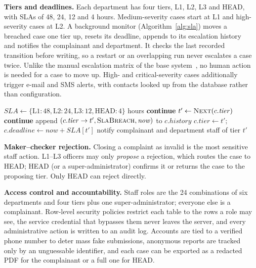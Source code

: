 \documentclass[conference]{IEEEtran}
\begin{document}
\textbf{Tiers and deadlines.} Each department has four tiers, L1, L2, L3 and HEAD, with SLAs of 48, 24, 12 and
4 hours. Medium-severity cases start at L1 and high-severity cases at L2. A background
monitor (Algorithm~\ref{alg:sla}) moves a breached case one tier up, resets its deadline, appends to its
escalation history and notifies the complainant and department. It checks the last recorded transition before
writing, so a restart or an overlapping run never escalates a case twice. Unlike the manual escalation matrix of
the base system~\cite{mohanraj2025railmadad}, no human action is needed for a case to move up. High- and
critical-severity cases additionally trigger e-mail and SMS alerts, with contacts looked up from the database
rather than configuration.

\begin{algorithm}[t]
\caption{SLA monitor (runs every 5 minutes)}
\label{alg:sla}
\footnotesize
\begin{algorithmic}[1]
\State $\mathit{SLA} \gets \{\mathrm{L1}{:}48, \mathrm{L2}{:}24, \mathrm{L3}{:}12, \mathrm{HEAD}{:}4\}$ hours
   \textbf{continue} 
  \EndIf
  \State $t' \gets \textsc{Next}(c.\mathit{tier})$ 
   \textbf{continue}
  \EndIf
  \State append $(c.\mathit{tier} \to t', \textsc{SlaBreach}, \mathit{now})$ to $c.\mathit{history}$
  \State $c.\mathit{tier} \gets t'$;\; $c.\mathit{deadline} \gets \mathit{now} + \mathit{SLA}[t']$
  \State notify complainant and department staff of tier $t'$
\EndFor
\end{algorithmic}
\end{algorithm}

\textbf{Maker--checker rejection.} Closing a complaint as invalid is the most sensitive staff action. L1--L3
officers may only \emph{propose} a rejection, which routes the case to HEAD; HEAD (or a super-administrator)
confirms it or returns the case to the proposing tier. Only HEAD can reject directly.

\textbf{Access control and accountability.} Staff roles are the 24 combinations of six departments and four tiers
plus one super-administrator; everyone else is a complainant. Row-level security policies
restrict each table to the rows a role may see, the service credential that bypasses them never leaves the server,
and every administrative action is written to an audit log. Accounts are tied to a verified phone number to deter
mass fake submissions, anonymous reports are tracked only by an unguessable identifier, and each case can be
exported as a redacted PDF for the complainant or a full one for HEAD.
\end{document}
